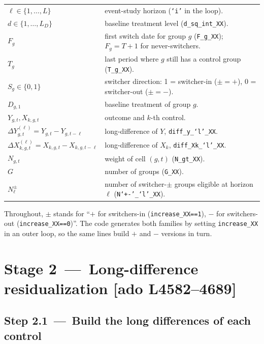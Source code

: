 \documentclass[11pt]{article}
\newcommand{\code}[1]{\texttt{\small #1}}
\newcommand{\Adoref}[1]{\textcolor{accent}{\footnotesize\textbf{[ado L#1]}}}
\newcommand{\1}{\mathbb{1}}
\newcommand{\Ngt}{N_{g,t}}
\begin{document}
\noindent
\begin{tabular}{@{}p{4.6cm}p{10.4cm}@{}}
\toprule
$\ell \in \{1,\dots,L\}$           & event-study horizon (\code{`i'} in the loop). \\
$d \in \{1,\dots,L_D\}$            & baseline treatment level (\code{d\_sq\_int\_XX}).\\
$F_g$                              & first switch date for group $g$ (\code{F\_g\_XX}); $F_g=T+1$ for never-switchers.\\
$T_g$                              & last period where $g$ still has a control group (\code{T\_g\_XX}).\\
$S_g \in \{0,1\}$                  & switcher direction: 1 = switcher-in ($\pm = +$), 0 = switcher-out ($\pm = -$).\\
$D_{g,1}$                          & baseline treatment of group $g$.\\
$Y_{g,t}, X_{k,g,t}$               & outcome and $k$-th control.\\
$\Delta Y^{(\ell)}_{g,t} = Y_{g,t} - Y_{g,t-\ell}$ & long-difference of $Y$, \code{diff\_y\_`l'\_XX}.\\
$\Delta X^{(\ell)}_{k,g,t} = X_{k,g,t} - X_{k,g,t-\ell}$ & long-difference of $X_k$, \code{diff\_X{k}\_`l'\_XX}.\\
$\Ngt$                             & weight of cell $(g,t)$ (\code{N\_gt\_XX}).\\
$G$                                & number of groups (\code{G\_XX}).\\
$N^{\pm}_{\ell}$                   & number of switcher-$\pm$ groups eligible at horizon $\ell$ (\code{N`+\!-'\_`l'\_XX}).\\
\bottomrule
\end{tabular}

\medskip\noindent
Throughout, $\pm$ stands for ``$+$ for switchers-in (\code{increase\_XX==1}),
$-$ for switchers-out (\code{increase\_XX==0})''. The code generates both
families by setting \code{increase\_XX} in an outer loop, so the same lines
build $+$ and $-$ versions in turn.

\section[Stage 2 -- Long-difference residualization (L4582--4689)]{Stage 2 \,---\, Long-difference residualization \Adoref{4582--4689}}

\subsection*{Step 2.1 \,---\, Build the long differences of each control}
\end{document}
